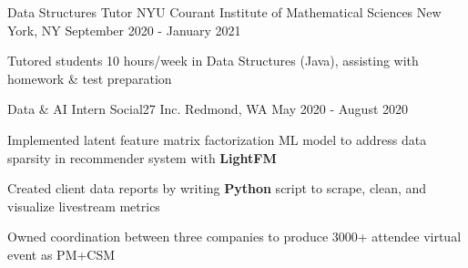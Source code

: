 \begin{cventries}
    \cventry
    {Data Structures Tutor} %
    {NYU Courant Institute of Mathematical Sciences} %
    {New York, NY} %
    {September 2020 - January 2021} %
    {
      \begin{cvitems} %
        \item {Tutored students 10 hours/week in Data Structures (Java), assisting with homework \& test preparation}
      \end{cvitems}
    }

  \cventry
    {Data \& AI Intern} %
    {Social27 Inc.} %
    {Redmond, WA} %
    {May 2020 - August 2020} %
    {
      \begin{cvitems} %
        \item {Implemented latent feature matrix factorization ML model to address data sparsity in recommender system with \textbf{LightFM}}
        \item {Created client data reports by writing \textbf{Python} script to scrape, clean, and visualize livestream metrics}
        \item {Owned coordination between three companies to produce 3000+ attendee virtual event as PM+CSM}
      \end{cvitems}
    }


\end{cventries}